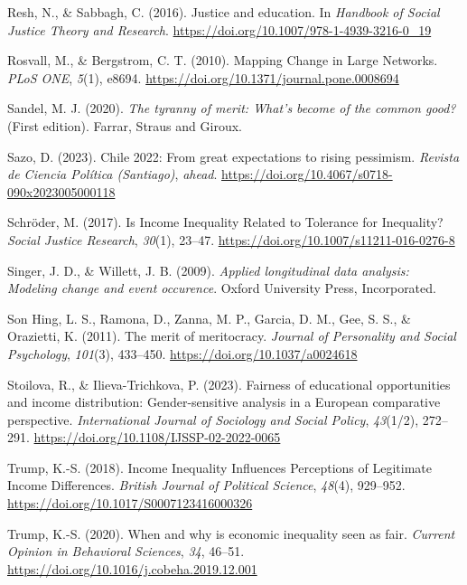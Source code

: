 \documentclass[
  12pt,
  a4paper,
]{article}
\newlength{\cslhangindent}
\newenvironment{CSLReferences}[2] %
 {%
  \setlength{\parindent}{0pt}
  \ifodd #1 \everypar{\setlength{\hangindent}{\cslhangindent}}\ignorespaces\fi
  \ifnum #2 > 0
  \setlength{\parskip}{#2\baselineskip}
  \fi
 }%
 {}
\begin{document}
\begin{CSLReferences}{1}{0}
Resh, N., \& Sabbagh, C. (2016). Justice and education. In \emph{Handbook of Social Justice Theory and Research}. \url{https://doi.org/10.1007/978-1-4939-3216-0_19}

Rosvall, M., \& Bergstrom, C. T. (2010). Mapping {Change} in {Large Networks}. \emph{PLoS ONE}, \emph{5}(1), e8694. \url{https://doi.org/10.1371/journal.pone.0008694}

Sandel, M. J. (2020). \emph{The tyranny of merit: {What}'s become of the common good?} (First edition). {Farrar, Straus and Giroux}.

Sazo, D. (2023). Chile 2022: {From} great expectations to rising pessimism. \emph{Revista de Ciencia Pol{í}tica (Santiago)}, \emph{ahead}. \url{https://doi.org/10.4067/s0718-090x2023005000118}

Schröder, M. (2017). Is {Income Inequality Related} to {Tolerance} for {Inequality}? \emph{Social Justice Research}, \emph{30}(1), 23--47. \url{https://doi.org/10.1007/s11211-016-0276-8}

Singer, J. D., \& Willett, J. B. (2009). \emph{Applied longitudinal data analysis: Modeling change and event occurence}. Oxford University Press, Incorporated.

Son Hing, L. S., Ramona, D., Zanna, M. P., Garcia, D. M., Gee, S. S., \& Orazietti, K. (2011). The merit of meritocracy. \emph{Journal of Personality and Social Psychology}, \emph{101}(3), 433--450. \url{https://doi.org/10.1037/a0024618}

Stoilova, R., \& Ilieva-Trichkova, P. (2023). Fairness of educational opportunities and income distribution: Gender-sensitive analysis in a {European} comparative perspective. \emph{International Journal of Sociology and Social Policy}, \emph{43}(1/2), 272--291. \url{https://doi.org/10.1108/IJSSP-02-2022-0065}

Trump, K.-S. (2018). Income {Inequality Influences Perceptions} of {Legitimate Income Differences}. \emph{British Journal of Political Science}, \emph{48}(4), 929--952. \url{https://doi.org/10.1017/S0007123416000326}

Trump, K.-S. (2020). When and why is economic inequality seen as fair. \emph{Current Opinion in Behavioral Sciences}, \emph{34}, 46--51. \url{https://doi.org/10.1016/j.cobeha.2019.12.001}


\end{CSLReferences}
\end{document}
